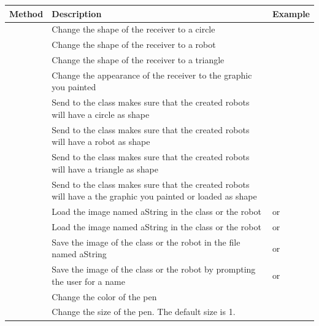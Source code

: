 \summa
\begin{table}[h]
\centering
\begin{tabular}{||p{4cm}|p{7cm}|p{5cm}||} \hline
Method&Description&Example\\[1ex] \hline
\ct{lookLikeCircle}&Change the shape of the receiver to  a circle& \ct{\Turtle new lookLikeCircle}\\ \hline
\ct{lookLikeBot}&Change the shape of the receiver to  a robot& \ct{\Turtle new lookLikeBot}\\ \hline
\ct{lookLikeTriangle}&Change the shape of the receiver to  a triangle&\ct{\Turtle new lookLikeTriangle}\\ \hline
\ct{lookLikeImage}&Change the appearance of the receiver to the graphic you painted& \ct{\Turtle new lookLikeImage} \\ \hline

\ct{lookLikeCircle}&Send to the class makes sure that the created robots will have a circle as shape& \ct{\Turtle lookLikeCircle}\\ \hline
\ct{lookLikeBot}&Send to the class makes sure that the created robots will have a robot as shape& \ct{\Turtle lookLikeBot}\\ \hline
\ct{lookLikeTriangle}&Send to the class makes sure that the created robots will have a triangle as shape&\ct{\Turtle lookLikeTriangle}\\ \hline
\ct{lookLikeImage}&Send to the class makes sure that the created robots will have a the graphic you painted or loaded as shape& \ct{\Turtle lookLikeImage} \\ \hline
\ct{loadImage: aString}&Load the image named aString in the class or the robot&\ct{\Turtle loadImage: 'spider'} or \ct{aBot loadImage: 'spider'}\\ \hline
\ct{loadImage}&Load the image named aString in the class or the robot&\ct{\Turtle loadImage} or \ct{aBot loadImage}\\ \hline
\ct{saveImage: aString}&Save the image of the class or the robot in the file named aString& \ct{\Turtle saveImage: 'spider'}  or \ct{aBot saveImage: 'spider'}\\ \hline
\ct{saveImage}&Save the image of the class or the robot by prompting the user for a name& \ct{\Turtle saveImage} or \ct{aBot saveImage} \\ \hline

\ct{penColor: aColor}&Change the color of the pen& \ct{\Turtle new penColor: Color blue}\\ \hline
\ct{penSize: aNumber}&Change the size of the pen. The default size is 1.&\ct{\Turtle new penSize: 3}\\ \hline


\end{tabular}
\end{table}
